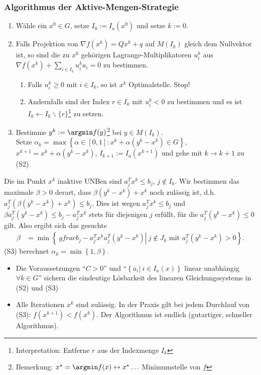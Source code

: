 \subsubsection{Algorithmus der Aktive-Mengen-Strategie}
\begin{enumerate}[label=(S\arabic*)]
  \item Wähle ein $x^0\in G$, setze $I_0:=I_a(x^0)$ und setze $k:=0$.
  \item Falls Projektion von $\nabla f(x^k)=Qx^k+q$ auf $M(I_k)$ gleich dem Nullvektor ist, so sind die zu $x^k$ gehörigen Lagrange-Multiplikatoren
  $u_i^k$ aus $\nabla f(x^k)+\sum\limits_{i\in I_k}u_i^ka_i=0$ zu bestimmen.
  \begin{enumerate}[label=(S2\alph*)]
    \item Falls $u_i^k\ge 0$ mit $i\in I_k$, so ist $x^k$ Optimalstelle. Stop!
    \item Andernfalls sind der Index $r\in I_k$ mit $u_i^k<0$ zu bestimmen und es ist $I_k\leftarrow I_k\backslash\{r\}$\footnote{Interpretation: Entferne $r$ aus der Indexmenge $I_k$}
    zu setzen.
  \end{enumerate}
  \item Bestimme $y^k:=\argmin f(y)$\footnote{Bemerkung: $x^{\star}=\argmin f(x) \leftrightarrow x^{\star}\ldots$ Minimumstelle von $f$} bei $y\in
  M(I_k)$.\\
  		Setze $\alpha_k=\max\left\{\alpha\in[0,1]:x^k+\alpha(y^k-x^k)\in G\right\}$, $x^{k+1}=x^k+\alpha(y^k-x^k)$, $I_{k+1}:=I_a(x^{k+1})$ und gehe mit
  		$k\rightarrow k+1$ zu (S2)
\end{enumerate}
\begin{remark}[zu (S3)]
  Die im Punkt $x^k$ inaktive UNBen sind $a_j^Tx^k\le b_j$, $j\notin I_k$.
  Wir bestimmen das maximale $\beta > 0$ derart, dass $\beta(y^k-x^k)+x^k$ noch zulässig ist, d.h. $a_j^T(\beta(y^k-x^k)+x^k)\le b_j$.
  Dies ist wegen $a_j^Tx^k\le b_j$ und $\beta a_j^T(y^k-x^k)\le b_j-a_j^Tx^k$ stets für diejenigen $j$ erfüllt, für die $a_j^T(y^k-x^k)\le 0$ gilt. 
  Also ergibt sich das gesuchte \begin{align*}
  \beta & = \min\left\{\left.\ gfrac{b_j-a_j^Tx^k}{a_j^T(y^k-x^k)}\right|\ j\notin J_k\text{ mit } a_j^T(y^k-x^k)>0 \right\}.
  \end{align*}
  (S3) berechnet $\alpha_k=\min\left\{1,\beta\right\}$.
\end{remark}
\begin{remark}\hspace{1mm}
\begin{itemize}
  \item Die Voraussetzungen ``$C>0$'' und ``$\left\{a_i|\ i\in I_a(x)\right\}$ linear unabhängig $\forall k\in G$'' sichern die eindeutige Lösbarkeit des linearen Gleichungssystems in
  (S2) und (S3)
  \item Alle Iterationen $x^k$ sind zulässig. In der Praxis gilt bei jedem Durchlauf von (S3): $f(x^{k+1})<f(x^k)$. Der Algorithmus ist endlich (gutartiger, schneller Algorithmus).
\end{itemize}
\end{remark}
